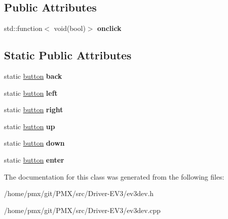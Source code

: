 \subsection*{Public Attributes}
\begin{DoxyCompactItemize}
\item 
\mbox{\label{classev3dev_1_1button_ad63094a3279d102d89ed7a214618360e}} 
std\+::function$<$ void(bool)$>$ {\bfseries onclick}
\end{DoxyCompactItemize}
\subsection*{Static Public Attributes}
\begin{DoxyCompactItemize}
\item 
\mbox{\label{classev3dev_1_1button_a3eb76175d207d59631c71f23361b3452}} 
static \hyperlink{classev3dev_1_1button}{button} {\bfseries back}
\item 
\mbox{\label{classev3dev_1_1button_a1371f9e1d81852b439bdced7cdd7af7e}} 
static \hyperlink{classev3dev_1_1button}{button} {\bfseries left}
\item 
\mbox{\label{classev3dev_1_1button_a1a0758959bf0dec54493b2e4ad9d4425}} 
static \hyperlink{classev3dev_1_1button}{button} {\bfseries right}
\item 
\mbox{\label{classev3dev_1_1button_a50dcc6df862aa34846fa5d4722f3a762}} 
static \hyperlink{classev3dev_1_1button}{button} {\bfseries up}
\item 
\mbox{\label{classev3dev_1_1button_ac3f98d647836b2d80440b1bddc5f4458}} 
static \hyperlink{classev3dev_1_1button}{button} {\bfseries down}
\item 
\mbox{\label{classev3dev_1_1button_a81c229f116dc46c0b95f03ff63b0ad8e}} 
static \hyperlink{classev3dev_1_1button}{button} {\bfseries enter}
\end{DoxyCompactItemize}


The documentation for this class was generated from the following files\+:\begin{DoxyCompactItemize}
\item 
/home/pmx/git/\+P\+M\+X/src/\+Driver-\/\+E\+V3/ev3dev.\+h\item 
/home/pmx/git/\+P\+M\+X/src/\+Driver-\/\+E\+V3/ev3dev.\+cpp\end{DoxyCompactItemize}
